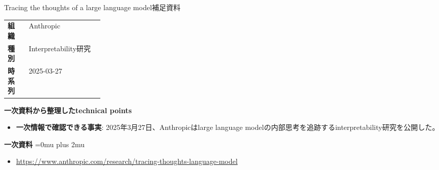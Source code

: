 \begin{technicalnote}{Tracing the thoughts of a large language model}{補足資料}
\begingroup
\begin{tabularx}{\linewidth}{@{}>{\bfseries}p{0.22\linewidth}X@{}}
組織 & Anthropic \\
種別 & Interpretability研究 \\
時系列 & 2025-03-27 \\
\end{tabularx}
\smallskip
\begin{minipage}{\linewidth}
{\bfseries 一次資料から整理したtechnical points}
\begin{itemize}[leftmargin=1.5em,itemsep=0.35em]
\item \textbf{一次情報で確認できる事実}: 2025年3月27日、Anthropicはlarge language modelの内部思考を追跡するinterpretability研究を公開した。
\end{itemize}
\begin{samepage}
{\bfseries 一次資料}
\begingroup\sloppy
\Urlmuskip=0mu plus 2mu\relax
\begin{itemize}[leftmargin=1.5em,itemsep=0.25em]
\item {\scriptsize\url{https://www.anthropic.com/research/tracing-thoughts-language-model}}
\end{itemize}
\endgroup
\end{samepage}
\end{minipage}
\endgroup
\end{technicalnote}
\medskip

